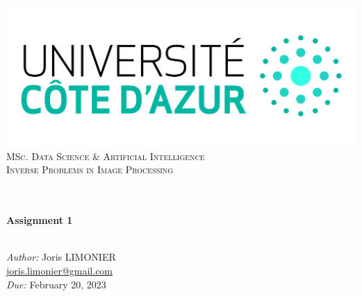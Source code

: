 \begin{titlepage}
	\begin{center}
		\includegraphics[width=\textwidth]{images/logo_uca.jpeg}\\[0.1cm]
		\vspace{1.5cm}
		\textsc{\Large MSc. Data Science \& Artificial Intelligence}\\[1.2cm]
		\textsc{\Large Inverse Problems in Image Processing}\\[1.2cm]
		\\
		\vspace{1cm}

		\HRule \\[0.6cm]
		{\huge \bfseries Assignment 1}\\[0.3cm]
		\HRule \\[1.8cm]
		\vfill

		\large
		\emph{Author:} Joris LIMONIER\\[.2cm]
		\href{mailto:joris.limonier@gmail.com}{\color{black}joris.limonier@gmail.com} \\[.2cm]
		\emph{Due:} {\large February 20, 2023}
	\end{center}
\end{titlepage}


